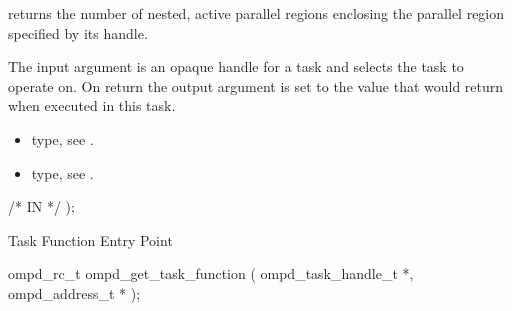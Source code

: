 \descr
{} returns the number of nested, active
parallel regions enclosing the parallel region specified by its handle.

\argdesc
The input argument  is an opaque handle for a task and selects the task to operate on.
On return the output argument  is set to the value that  would return when
executed in this task.

\crossreferences
\begin{itemize}
	\item {} type, see .
	\item {} type, see .
\end{itemize}

%
  /* IN */
);
%
%


\label{ompd:ompd_get_task_function}
\summary
Task Function Entry Point
\format
\begin{cspecific}
\begin{ompSyntax}
ompd_rc_t ompd_get_task_function (
  ompd_task_handle_t *,
  ompd_address_t *
);
\end{ompSyntax}
\end{cspecific}

